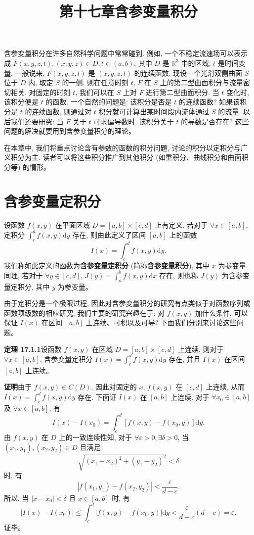 \documentclass[UTF8, 12pt, fontset=fandol, oneside]{ctexart}
\title{第十七章\quad 含参变量积分}
\author{}
\date{}
\begin{document}
\maketitle

含参变量积分在许多自然科学问题中常常碰到. 例如, 一个不稳定流速场可以表示成 $F(x,y,z,t),(x,y,z)\in D,t\in(a,b)$, 其中 $D$ 是 $\mathbb R^3$ 中的区域, $t$ 是时间变量. 一般说来, $F(x,y,z,t)$ 是 $(x,y,z,t)$ 的连续函数. 现设一个光滑双侧曲面 $S$ 位于 $D$ 内, 取定 $S$ 的一侧, 则在任意时刻 $t$, $F$ 在 $S$ 上的第二型曲面积分与流量密切相关. 对固定的时刻 $t$, 我们可以在 $S$ 上对 $F$ 进行第二型曲面积分. 当 $t$ 变化时, 该积分便是 $t$ 的函数. 一个自然的问题是: 该积分是否是 $t$ 的连续函数? 如果该积分是 $t$ 的连续函数, 则通过对 $t$ 积分就可计算出某时间段内流体通过 $S$ 的流量. 以后我们还要研究: 当 $F$ 关于 $t$ 可求偏导数时, 该积分关于 $t$ 的导数是否存在? 这些问题的解决就要用到含参变量积分的理论。

在本章中, 我们将重点讨论含有参数的函数的积分问题, 讨论的积分以定积分与广义积分为主. 读者可以将这些积分推广到其他积分 (如重积分、曲线积分和曲面积分等) 的情形。

\section{含参变量定积分}

设函数 $f(x,y)$ 在平面区域 $D=[a,b]\times[c,d]$ 上有定义. 若对于 $\forall x\in[a,b]$, 定积分 $\int_c^d f(x,y)\mathrm dy$ 存在, 则由此定义了区间 $[a,b]$ 上的函数
\[
  I(x)=\int_c^d f(x,y)\mathrm dy.
\]
我们称如此定义的函数为\textbf{含参变量定积分} (简称\textbf{含参变量积分}), 其中 $x$ 为参变量. 同理, 若对于 $\forall y\in[c,d]$, $J(y)=\int_a^b f(x,y)\mathrm dx$ 存在, 则也称 $J(y)$ 为含参变量定积分, 其中 $y$ 为参变量。

由于定积分是一个极限过程, 因此对含参变量积分的研究有点类似于对函数序列或函数项级数的相应研究. 我们主要的研究兴趣在于: 对 $f(x,y)$ 加什么条件, 可以保证 $I(x)$ 在区间 $[a,b]$ 上连续、可积以及可导? 下面我们分别来讨论这些问题。

\noindent\textbf{定理 17.1.1}\quad 设函数 $f(x,y)$ 在区域 $D=[a,b]\times[c,d]$ 上连续, 则对于 $\forall x\in[a,b]$, 含参变量定积分 $I(x)=\int_c^d f(x,y)\mathrm dy$ 存在, 并且 $I(x)$ 在区间 $[a,b]$ 上连续。

\noindent\textbf{证明}\quad 由于 $f(x,y)\in C(D)$, 因此对固定的 $x$, $f(x,y)$ 在 $[c,d]$ 上连续, 从而 $I(x)=\int_c^d f(x,y)\mathrm dy$ 存在. 下面证 $I(x)$ 在 $[a,b]$ 上连续. 对于 $\forall x_0\in[a,b]$ 及 $\forall x\in[a,b]$, 有
\[
  I(x)-I(x_0)=\int_c^d [f(x,y)-f(x_0,y)]\mathrm dy.
\]
由 $f(x,y)$ 在 $D$ 上的一致连续性知, 对于 $\forall\varepsilon>0,\exists\delta>0$, 当 $(x_1,y_1),(x_2,y_2)\in D$ 且满足
\[
  \sqrt{(x_1-x_2)^2+(y_1-y_2)^2}<\delta
\]
时, 有
\[
  |f(x_1,y_1)-f(x_2,y_2)|<\frac{\varepsilon}{d-c}.
\]
所以, 当 $|x-x_0|<\delta$ 且 $x\in[a,b]$ 时, 有
\[
  |I(x)-I(x_0)|
  \leqslant \int_c^d |f(x,y)-f(x_0,y)|\mathrm dy
  < \frac{\varepsilon}{d-c}(d-c)=\varepsilon.
\]
证毕。
\end{document}

